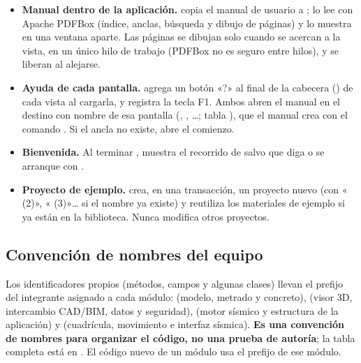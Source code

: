 \begin{itemize}
	\item \textbf{Manual dentro de la aplicación.}  copia el manual de usuario a
	      ;  lo lee con Apache PDFBox (índice, anclas, búsqueda y dibujo
	      de páginas) y  lo muestra en una ventana aparte. Las páginas se dibujan solo cuando se acercan
	      a la vista, en un único hilo de trabajo (PDFBox no es seguro entre hilos), y se liberan al alejarse.
	\item \textbf{Ayuda de cada pantalla.}  agrega un botón «?» al final de la cabecera
	      () de cada vista al cargarla, y registra la tecla F1. Ambos abren el manual en el destino
	      con nombre de esa pantalla (, , \ldots; tabla
	      ), que el manual crea con el comando .
	      Si el ancla no existe, abre el comienzo.
	\item \textbf{Bienvenida.} Al terminar ,  muestra
	      el recorrido de  salvo que  diga 
	      o se arranque con .
	\item \textbf{Proyecto de ejemplo.}  crea, en una transacción, un
	      proyecto nuevo (con « (2)», « (3)»\ldots{} si el nombre ya existe) y reutiliza los materiales de ejemplo si ya
	      están en la biblioteca. Nunca modifica otros proyectos.
\end{itemize}

\subsection{Convención de nombres del equipo}

Los identificadores propios (métodos, campos y algunas clases) llevan el prefijo del integrante asignado a cada módulo:
 (modelo, metrado y concreto),  (visor 3D, intercambio CAD/BIM, datos y
seguridad),  (motor sísmico y estructura de la aplicación) y  (cuadrícula,
movimiento e interfaz sísmica). \textbf{Es una convención de nombres para organizar el código, no una prueba de
autoría}; la tabla completa está en . El código nuevo de un módulo usa el prefijo
de ese módulo.
